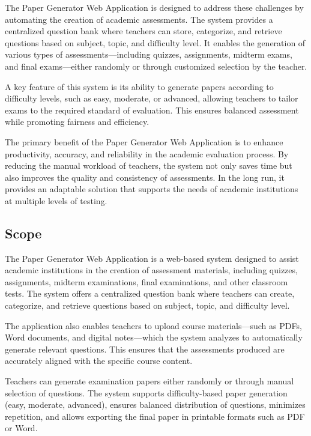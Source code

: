 \documentclass[12pt]{article}
\begin{document}
	The Paper Generator Web Application is designed to address these challenges by automating the creation of academic assessments. The system provides a centralized question bank where teachers can store, categorize, and retrieve questions based on subject, topic, and difficulty level. It enables the generation of various types of assessments—including quizzes, assignments, midterm exams, and final exams—either randomly or through customized selection by the teacher.
	
	A key feature of this system is its ability to generate papers according to difficulty levels, such as easy, moderate, or advanced, allowing teachers to tailor exams to the required standard of evaluation. This ensures balanced assessment while promoting fairness and efficiency.
	
	The primary benefit of the Paper Generator Web Application is to enhance productivity, accuracy, and reliability in the academic evaluation process. By reducing the manual workload of teachers, the system not only saves time but also improves the quality and consistency of assessments. In the long run, it provides an adaptable solution that supports the needs of academic institutions at multiple levels of testing.
	
	\subsection{Scope}
	The Paper Generator Web Application is a web-based system designed to assist academic institutions in the creation of assessment materials, including quizzes, assignments, midterm examinations, final examinations, and other classroom tests. The system offers a centralized question bank where teachers can create, categorize, and retrieve questions based on subject, topic, and difficulty level.
	
	The application also enables teachers to upload course materials—such as PDFs, Word documents, and digital notes—which the system analyzes to automatically generate relevant questions. This ensures that the assessments produced are accurately aligned with the specific course content.
	
	Teachers can generate examination papers either randomly or through manual selection of questions. The system supports difficulty-based paper generation (easy, moderate, advanced), ensures balanced distribution of questions, minimizes repetition, and allows exporting the final paper in printable formats such as PDF or Word.
	
\end{document}
